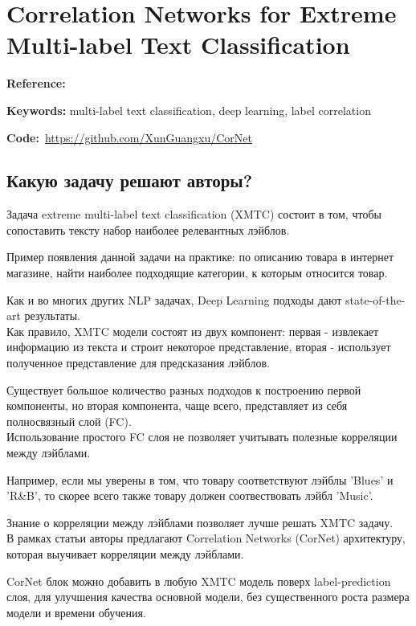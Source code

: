 \chapter{Correlation Networks for Extreme Multi-label Text Classification}

\textbf{Reference:}~\cite{xun2020correlation}

\textbf{Keywords:} multi-label text classification, deep learning, label correlation

\textbf{Code:}~\url{https://github.com/XunGuangxu/CorNet}

\section*{Какую задачу решают авторы?}

Задача extreme multi-label text classification (XMTC) состоит в том, чтобы сопоставить тексту набор наиболее релевантных лэйблов.

Пример появления данной задачи на практике: по описанию товара в интернет магазине, найти наиболее подходящие категории, к которым относится товар.

Как и во многих других NLP задачах, Deep Learning подходы дают state-of-the-art результаты. \\

Как правило, XMTC модели состоят из двух компонент: первая - извлекает информацию из текста и строит некоторое представление, вторая - использует полученное представление для предсказания лэйблов.

Существует большое количество разных подходов к построению первой компоненты, но вторая компонента, чаще всего, представляет из себя полносвязный слой (FC). \\

Использование простого FC слоя не позволяет учитывать полезные корреляции между лэйблами. 

Например, если мы уверены в том, что товару соответствуют лэйблы 'Blues' и 'R\&B', то скорее всего также товару должен соотвествовать лэйбл 'Music'. 

Знание о корреляции между лэйблами позволяет лучше решать XMTC задачу. \\

В рамках статьи авторы предлагают Correlation Networks (CorNet) архитектуру, которая выучивает корреляции между лэйблами.

CorNet блок можно добавить в любую XMTC модель поверх label-prediction слоя, для улучшения качества основной модели, без существенного роста размера модели и времени обучения.

